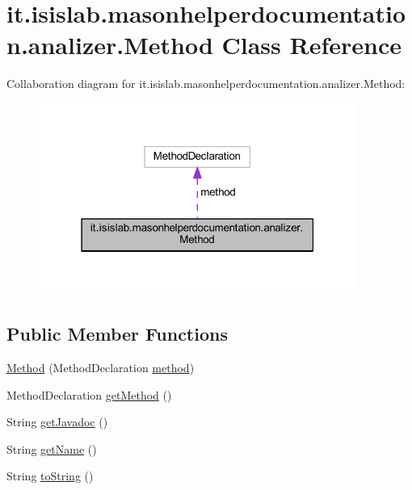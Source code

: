 \hypertarget{classit_1_1isislab_1_1masonhelperdocumentation_1_1analizer_1_1_method}{\section{it.\-isislab.\-masonhelperdocumentation.\-analizer.\-Method Class Reference}
\label{classit_1_1isislab_1_1masonhelperdocumentation_1_1analizer_1_1_method}
}


Collaboration diagram for it.\-isislab.\-masonhelperdocumentation.\-analizer.\-Method\-:
\nopagebreak
\begin{figure}[H]
\begin{center}
\leavevmode
\includegraphics[width=295pt]{classit_1_1isislab_1_1masonhelperdocumentation_1_1analizer_1_1_method__coll__graph}
\end{center}
\end{figure}
\subsection*{Public Member Functions}
\begin{DoxyCompactItemize}
\item 
\hyperlink{classit_1_1isislab_1_1masonhelperdocumentation_1_1analizer_1_1_method_ad78f0e595b288424c9ce252fdb70a72d}{Method} (Method\-Declaration \hyperlink{classit_1_1isislab_1_1masonhelperdocumentation_1_1analizer_1_1_method_a86b6aa02f4993d83ee78e19f1f211130}{method})
\item 
Method\-Declaration \hyperlink{classit_1_1isislab_1_1masonhelperdocumentation_1_1analizer_1_1_method_a5bfd1c50aae2fe3d33e58132b0439796}{get\-Method} ()
\item 
String \hyperlink{classit_1_1isislab_1_1masonhelperdocumentation_1_1analizer_1_1_method_a4289b699595931edc00f2d80ae8e8af3}{get\-Javadoc} ()
\item 
String \hyperlink{classit_1_1isislab_1_1masonhelperdocumentation_1_1analizer_1_1_method_ab867c9f3e8a3b0aa9f960d3fe3a1db04}{get\-Name} ()
\item 
String \hyperlink{classit_1_1isislab_1_1masonhelperdocumentation_1_1analizer_1_1_method_abd783b39c400e8db1f5e0f08c00c8e5a}{to\-String} ()
\end{DoxyCompactItemize}
